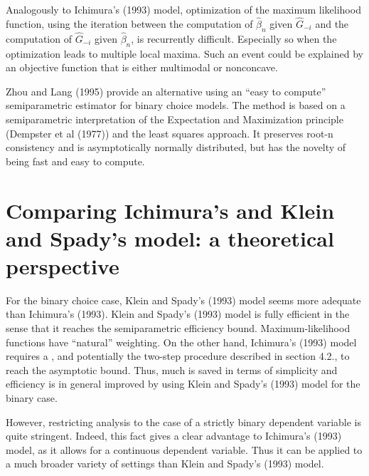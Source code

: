 \documentclass[a4paper]{article}
\begin{document}
Analogously to Ichimura's (1993) model, optimization of the maximum likelihood function, using the iteration between the computation of $\hat{\beta}_n$ given $\hat{G}_{-i}$ and the computation of $\hat{G}_{-i}$ given $\hat{\beta}_n$, is recurrently difficult.  Especially so when the optimization leads to multiple local maxima. Such an event could be explained by an objective function that is either multimodal or nonconcave. 

Zhou and Lang (1995) provide an alternative using an ``easy to compute'' semiparametric estimator for binary choice models. The method is based on a semiparametric interpretation of the Expectation and Maximization principle (Dempster et al (1977)) and the least squares approach. It preserves root-n consistency and is asymptotically normally distributed, but has the novelty of being fast and easy to compute.

\section{Comparing Ichimura's and Klein and Spady's model: a theoretical perspective} %
\label{sec:Comparing Ichimura's and Klein and Spady's model: a theoretical perspective}

For the binary choice case, Klein and Spady's (1993) model seems more adequate than Ichimura's (1993). Klein and Spady's (1993) model is fully efficient in the sense that it reaches the semiparametric efficiency bound. Maximum-likelihood functions have ``natural'' weighting. On the other hand, Ichimura's (1993) model requires a 
, and potentially the two-step procedure described in section 4.2., to reach the asymptotic bound. Thus, much is saved in terms of simplicity and efficiency is in general improved by using Klein and Spady's (1993) model for the binary case.

However, restricting analysis to the case of a strictly binary dependent variable is quite stringent. Indeed, this fact gives a clear advantage to Ichimura's (1993) model, as it allows for a continuous dependent variable. Thus it can be applied to a much broader variety of settings than Klein and Spady's (1993) model.


\newpage 


\end{document}
